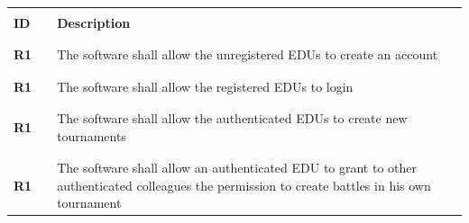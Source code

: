 \renewcommand{\arraystretch}{0.5}
\begin{table}[H]
    \centering
    \begin{tabular}{l l p{12cm}} 
        \hline
                     &        &                                                                                                                                                                         \\
        \textbf{ID}  & \vline & \textbf{Description}                                                                                                                                                    \\
                     &        &                                                                                                                                                                         \\\hline & & \\   
        \textbf{R1} & \vline & The software shall allow the unregistered EDUs to create an account                                                                                                     \\
                     &        &                                                                                                                                                                         \\\hline & & \\
        \textbf{R1} & \vline & The software shall allow the registered EDUs to login                                                                                                                   \\
                     &        &                                                                                                                                                                         \\\hline & & \\
        \textbf{R1} & \vline & The software shall allow the authenticated EDUs to create new tournaments                                                                                               \\
                     &        &                                                                                                                                                                         \\\hline & & \\
        \textbf{R1} & \vline & The software shall allow an authenticated EDU to grant to other authenticated colleagues the permission to create battles in his own tournament                         \\

\end{tabular}
\end{table}
